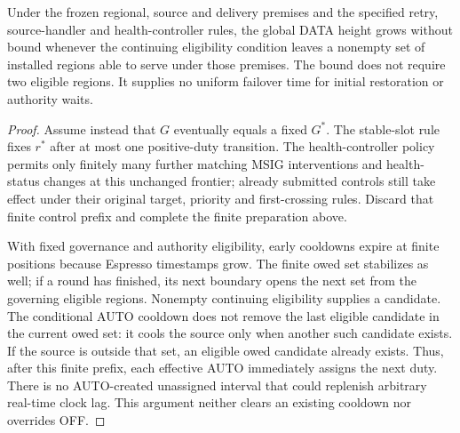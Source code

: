 \begin{proposition}
\label{prop:v35-global-progress}
Under the frozen regional, source and delivery premises and the specified
retry, source-handler and health-controller rules, the global DATA
height grows without bound whenever the continuing eligibility condition
leaves a nonempty set of installed regions able to serve under those
premises. The bound does not require two eligible regions. It supplies
no uniform failover time for initial restoration or authority waits.
\end{proposition}
\begin{proof}
Assume instead that $G$ eventually equals a fixed $G^*$. The stable-slot
rule fixes $r^*$ after at most one positive-duty transition. The
health-controller policy permits only finitely many further matching
MSIG interventions and health-status changes at this unchanged frontier;
already submitted controls still take effect under their original
target, priority and first-crossing rules. Discard that finite control
prefix and complete the finite preparation above.

With fixed governance and authority eligibility, early cooldowns expire
at finite positions because Espresso timestamps grow. The finite owed
set stabilizes as well; if a round has finished, its next boundary opens
the next set from the governing eligible regions. Nonempty continuing
eligibility supplies a candidate. The conditional AUTO cooldown does
not remove the last eligible candidate in the current owed set: it
cools the source only when another such candidate exists. If the source
is outside that set, an eligible owed candidate already exists. Thus,
after this finite prefix, each effective AUTO immediately assigns the
next duty. There is no AUTO-created unassigned interval that could
replenish arbitrary real-time clock lag. This argument neither clears
an existing cooldown nor overrides OFF.


\end{proof}
